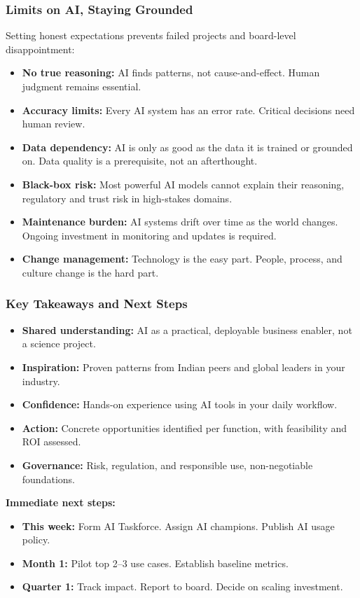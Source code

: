 \begin{frame}[fragile]\frametitle{Limits on AI, Staying Grounded}

Setting honest expectations prevents failed projects and board-level disappointment:
\begin{itemize}
  \item \textbf{No true reasoning:} AI finds patterns, not cause-and-effect. Human judgment remains essential.
  \item \textbf{Accuracy limits:} Every AI system has an error rate. Critical decisions need human review.
  \item \textbf{Data dependency:} AI is only as good as the data it is trained or grounded on. Data quality is a prerequisite, not an afterthought.
  \item \textbf{Black-box risk:} Most powerful AI models cannot explain their reasoning, regulatory and trust risk in high-stakes domains.
  \item \textbf{Maintenance burden:} AI systems drift over time as the world changes. Ongoing investment in monitoring and updates is required.
  \item \textbf{Change management:} Technology is the easy part. People, process, and culture change is the hard part.
\end{itemize}

\end{frame}

\begin{frame}[fragile]\frametitle{Key Takeaways and Next Steps}

\begin{itemize}
  \item \textbf{Shared understanding:} AI as a practical, deployable business enabler, not a science project.
  \item \textbf{Inspiration:} Proven patterns from Indian peers and global leaders in your industry.
  \item \textbf{Confidence:} Hands-on experience using AI tools in your daily workflow.
  \item \textbf{Action:} Concrete opportunities identified per function, with feasibility and ROI assessed.
  \item \textbf{Governance:} Risk, regulation, and responsible use, non-negotiable foundations.
\end{itemize}

\vspace{0.4em}
\textbf{Immediate next steps:}
\begin{itemize}
  \item \textbf{This week:} Form AI Taskforce. Assign AI champions. Publish AI usage policy.
  \item \textbf{Month 1:} Pilot top 2--3 use cases. Establish baseline metrics.
  \item \textbf{Quarter 1:} Track impact. Report to board. Decide on scaling investment.
\end{itemize}

\end{frame}


